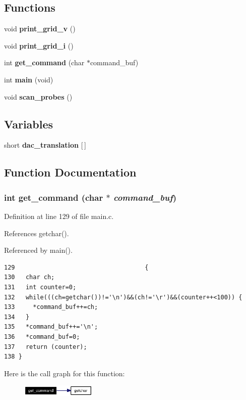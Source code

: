 \subsection*{Functions}
\begin{CompactItemize}
\item 
void {\bf print\_\-grid\_\-v} ()
\item 
void {\bf print\_\-grid\_\-i} ()
\item 
int {\bf get\_\-command} (char $\ast$command\_\-buf)
\item 
int {\bf main} (void)
\item 
void {\bf scan\_\-probes} ()
\end{CompactItemize}
\subsection*{Variables}
\begin{CompactItemize}
\item 
short {\bf dac\_\-translation} [$\,$]
\end{CompactItemize}


\subsection{Function Documentation}
\subsubsection{\setlength{\rightskip}{0pt plus 5cm}int get\_\-command (char $\ast$ {\em command\_\-buf})}\label{main_8c_a3}




Definition at line 129 of file main.c.

References getchar().

Referenced by main().

\footnotesize\begin{verbatim}129                                    {
130   char ch;
131   int counter=0;
132   while(((ch=getchar())!='\n')&&(ch!='\r')&&(counter++<100)) {
133     *command_buf++=ch;
134   }
135   *command_buf++='\n';
136   *command_buf=0;
137   return (counter);
138 }     
\end{verbatim}\normalsize 




Here is the call graph for this function:\begin{figure}[H]
\begin{center}
\leavevmode
\includegraphics[width=101pt]{main_8c_a3_cgraph}
\end{center}
\end{figure}

